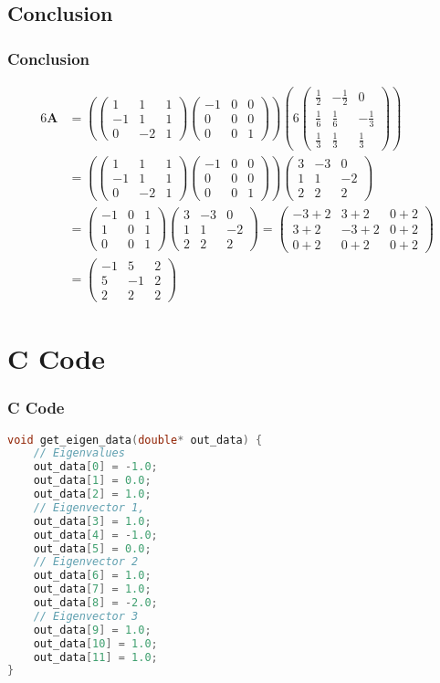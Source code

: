 \documentclass{beamer}
\providecommand{\brak}[1]{\ensuremath{\left(#1\right)}}
\theoremstyle{remark}
\newcommand{\myvec}[1]{\ensuremath{\begin{pmatrix}#1\end{pmatrix}}}
\let\vec\mathbf
\numberwithin{equation}{section}
\begin{document}
\subsection{Conclusion}
\begin{frame}[fragile]
\frametitle{Conclusion}
 \begin{align}
6\vec{A}&=\brak{\myvec{1&1&1\\-1&1&1\\0&-2&1}\myvec{-1&0&0\\0&0&0\\0&0&1}}\brak{6\myvec{\frac{1}{2} & -\frac{1}{2} & 0 \\\frac{1}{6} & \frac{1}{6} & -\frac{1}{3}\\ \frac{1}{3} & \frac{1}{3} & \frac{1}{3}}}\\
&=\brak{\myvec{1&1&1\\-1&1&1\\0&-2&1}\myvec{-1&0&0\\0&0&0\\0&0&1} }\myvec{3 & -3 & 0 \\1 & 1 & -2\\ 2 & 2 & 2}\\
&=\myvec{-1 & 0 & 1 \\ 1& 0 & 1 \\0 & 0 & 1}\myvec{3 & -3 & 0 \\1 & 1 & -2\\ 2 & 2 & 2}
=\myvec{-3+2& 3+2&0+2\\3+2&-3+2&0+2\\0+2&0+2&0+2} \\
&=\myvec{-1&5&2\\5&-1&2\\2&2&2}
\end{align}
\end{frame}

\section{C Code}
\begin{frame}[fragile]
\frametitle{C Code}
\begin{lstlisting}[language=C]
void get_eigen_data(double* out_data) {
    // Eigenvalues
    out_data[0] = -1.0;
    out_data[1] = 0.0;
    out_data[2] = 1.0;
    // Eigenvector 1,
    out_data[3] = 1.0;
    out_data[4] = -1.0;
    out_data[5] = 0.0;
    // Eigenvector 2
    out_data[6] = 1.0;
    out_data[7] = 1.0;
    out_data[8] = -2.0;
    // Eigenvector 3
    out_data[9] = 1.0;
    out_data[10] = 1.0;
    out_data[11] = 1.0;
}
\end{lstlisting}
\end{frame}
\end{document}

